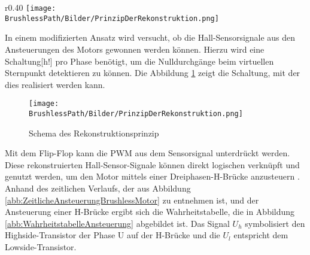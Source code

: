         \ifEMBED
        \begin{wrapfigure}{r}{0.40\textwidth}
            \texttt{[image: \\BrushlessPath/Bilder/PrinzipDerRekonstruktion.png]}
            \centering
            \caption[Schema des Rekonstruktionsprinzip]{Schema des Rekonstruktionsprinzip \cite{HSLU:Pluess}}
            \label{abb:PrinzipRekonstruktion}
            \end{wrapfigure}
        \fi
        In einem modifizierten Ansatz wird versucht, ob die Hall-Sensorsignale 
        aus den Ansteuerungen des Motors gewonnen werden können. Hierzu wird 
        eine Schaltung[h!] pro Phase benötigt, um die Nulldurchgänge beim 
        virtuellen Sternpunkt detektieren zu können. Die Abbildung 
        \ref{abb:PrinzipRekonstruktion} zeigt die Schaltung, mit der dies 
        realisiert werden kann. 
        \ifSTANDALONE
	\begin{figure}[h!]
            \centering
            \texttt{[image: \\BrushlessPath/Bilder/PrinzipDerRekonstruktion.png]}
           	\caption{Schema des Rekonstruktionsprinzip \protect\cite{HSLU:Pluess}}
            \label{abb:PrinzipRekonstruktion}
        \end{figure}
        \fi
        Mit dem Flip-Flop kann die PWM aus dem 
        Sensorsignal unterdrückt werden. Diese rekonstruierten 
        Hall-Sensor-Signale können direkt logischen verknüpft und genutzt 
        werden, um den Motor mittels einer Dreiphasen-H-Brücke anzusteuern 
        \cite{HSLU:Pluess}. Anhand des zeitlichen Verlaufs, der aus Abbildung 
        \ref{abb:ZeitlicheAnsteuerungBrushlessMotor} zu entnehmen ist, und der 
        Ansteuerung einer H-Brücke ergibt sich die Wahrheitstabelle, die in 
        Abbildung \ref{abb:WahrheitstabelleAnsteuerung} abgebildet ist. Das 
        Signal $U_h$ symbolisiert den Highside-Transistor der Phase U auf der 
        H-Brücke und die $U_l$ entspricht dem Lowside-Transistor.\\      
        

